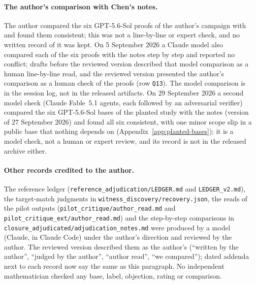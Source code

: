 \paragraph{The author's comparison with Chen's notes.} The author compared the six GPT-5.6-Sol proofs of the author's campaign with \citet{chen2026notes} and found them consistent; this was not a line-by-line or expert check, and no written record of it was kept. On 5 September 2026 a Claude model also compared each of the six proofs with the notes step by step and reported no conflict; drafts before the reviewed version described that model comparison as a human line-by-line read, and the reviewed version presented the author's comparison as a human check of the proofs (row \texttt{Q13}). The model comparison is in the session log, not in the released artifacts. On 29 September 2026 a second model check (Claude Fable~5.1 agents, each followed by an adversarial verifier) compared the six GPT-5.6-Sol bases of the planted study with the notes (version of 27 September 2026) and found all six consistent, with one minor scope slip in a public base that nothing depends on (Appendix~\ref{app:planted-bases}); it is a model check, not a human or expert review, and its record is not in the released archive either.

\paragraph{Other records credited to the author.} The reference ledger (\texttt{reference\_adjudication/\allowbreak LEDGER.md} and \texttt{LEDGER\_v2.md}), the target-match judgments in \texttt{witness\_discovery/\allowbreak recovery.json}, the reads of the pilot outputs (\texttt{pilot\_critique/\allowbreak author\_read.md} and \texttt{pilot\_critique\_ext/\allowbreak author\_read.md}) and the step-by-step comparisons in \texttt{closure\_adjudicated/\allowbreak adjudication\_notes.md} were produced by a model (Claude, in Claude Code) under the author's direction and reviewed by the author. The reviewed version described them as the author's (``written by the author'', ``judged by the author'', ``author read'', ``we compared''); dated addenda next to each record now say the same as this paragraph. No independent mathematician checked any base, label, objection, rating or comparison.

